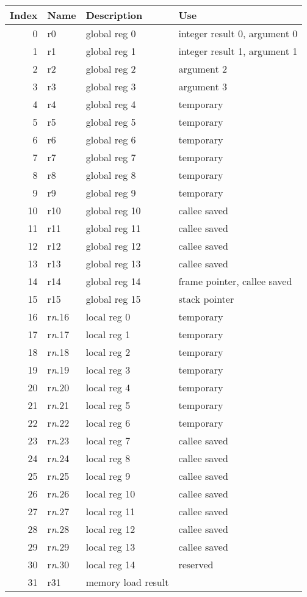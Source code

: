 \documentclass[10pt,DIV12]{scrartcl}
\begin{document}
\begin{tabular}{rlll}
\toprule
Index & Name & Description & Use \\
\midrule
0 & r0 & global reg 0 & integer result 0, argument 0 \\
1 & r1 & global reg 1 & integer result 1, argument 1 \\
2 & r2 & global reg 2 & argument 2 \\
3 & r3 & global reg 3 & argument 3 \\
4 & r4 & global reg 4 & temporary \\
5 & r5 & global reg 5 & temporary \\
6 & r6 & global reg 6 & temporary \\
7 & r7 & global reg 7 & temporary \\
8 & r8 & global reg 8 & temporary \\
9 & r9 & global reg 9 & temporary \\
10 & r10 & global reg 10 & callee saved \\
11 & r11 & global reg 11 & callee saved \\
12 & r12 & global reg 12 & callee saved \\
13 & r13 & global reg 13 & callee saved \\
14 & r14 & global reg 14 & frame pointer, callee saved \\
15 & r15 & global reg 15 & stack pointer \\
\cmidrule{1-4}
16 & r\textit{n}.16 & local reg 0 & temporary \\
17 & r\textit{n}.17 & local reg 1 & temporary \\
18 & r\textit{n}.18 & local reg 2 & temporary \\
19 & r\textit{n}.19 & local reg 3 & temporary \\
20 & r\textit{n}.20 & local reg 4 & temporary \\
21 & r\textit{n}.21 & local reg 5 & temporary \\
22 & r\textit{n}.22 & local reg 6 & temporary \\
23 & r\textit{n}.23 & local reg 7 & callee saved \\
24 & r\textit{n}.24 & local reg 8 & callee saved \\
25 & r\textit{n}.25 & local reg 9 & callee saved \\
26 & r\textit{n}.26 & local reg 10 & callee saved \\
27 & r\textit{n}.27 & local reg 11 & callee saved \\
28 & r\textit{n}.28 & local reg 12 & callee saved \\
29 & r\textit{n}.29 & local reg 13 & callee saved \\
30 & r\textit{n}.30 & local reg 14 & reserved \\
31 & r31 & memory load result \\
\bottomrule 
\end{tabular}
\end{document}
